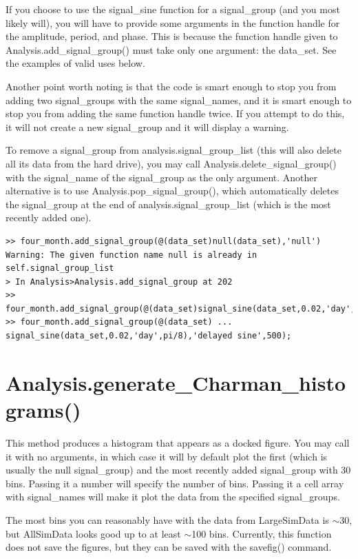 \documentclass[12pt]{report}
\begin{document}
If you choose to use the signal\_sine function for a signal\_group (and you most likely will), you will have to provide some arguments in the function handle for the amplitude, period, and phase.  This is because the function handle given to Analysis.add\_signal\_group() must take only one argument: the data\_set.  See the examples of valid uses below.

Another point worth noting is that the code is smart enough to stop you from adding two signal\_groups with the same signal\_names, and it is smart enough to stop you from adding the same function handle twice.  If you attempt to do this, it will not create a new signal\_group and it will display a warning.

To remove a signal\_group from analysis.signal\_group\_list (this will also delete all its data from the hard drive), you may call Analysis.delete\_signal\_group() with the signal\_name of the signal\_group as the only argument.  Another alternative is to use Analysis.pop\_signal\_group(), which automatically deletes the signal\_group at the end of analysis.signal\_group\_list (which is the most recently added one).

\begin{verbatim}
>> four_month.add_signal_group(@(data_set)null(data_set),'null')
Warning: The given function name null is already in self.signal_group_list 
> In Analysis>Analysis.add_signal_group at 202 
>> four_month.add_signal_group(@(data_set)signal_sine(data_set,0.02,'day',0));
>> four_month.add_signal_group(@(data_set) ...
signal_sine(data_set,0.02,'day',pi/8),'delayed sine',500);
\end{verbatim}

\section{Analysis.generate\_Charman\_histograms()}
This method produces a histogram that appears as a docked figure.  You may call it with no arguments, in which case it will by default plot the first (which is usually the null signal\_group) and the most recently added signal\_group with 30 bins.  Passing it a number will specify the number of bins.  Passing it a cell array with signal\_names will make it plot the data from the specified signal\_groups.

The most bins you can reasonably have with the data from LargeSimData is ${\sim}$30, but AllSimData looks good up to at least ${\sim}$100 bins.  Currently, this function does not save the figures, but they can be saved with the savefig() command.
\end{document}
